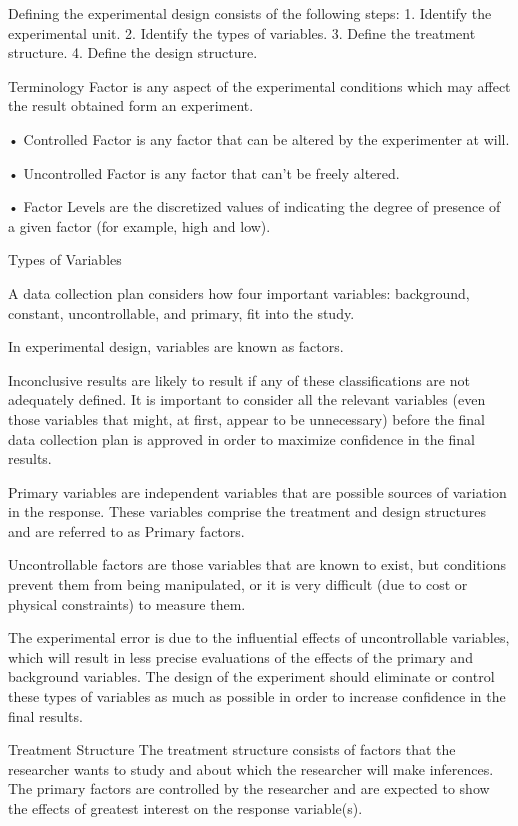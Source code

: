 Defining the experimental design consists of the following steps:
1. Identify the experimental unit.
2. Identify the types of variables.
3. Define the treatment structure.
4. Define the design structure.

Terminology
Factor is any aspect of the experimental conditions which may affect the result obtained form an experiment. 

•	Controlled Factor is any factor that can be altered by the experimenter at will.

•	Uncontrolled Factor is any factor that can’t be freely altered.

•	Factor Levels are the discretized values of indicating the degree of presence of a given factor (for example, high and low).


Types of Variables

A data collection plan considers how four important variables: background, constant, uncontrollable, and primary, fit into the study. 

In experimental design, variables are known as factors.

Inconclusive results are likely to result if any of these classifications are not adequately defined. It is important to consider all the relevant
variables (even those variables that might, at first, appear to be unnecessary) before the final data collection plan is approved in order to maximize confidence in the final results.

Primary variables are independent variables that are possible sources of variation in the response. These variables comprise the treatment and design structures and are referred to as Primary factors.

Uncontrollable factors are those variables that are known to exist, but
conditions prevent them from being manipulated, or it is very difficult (due to cost or physical constraints) to measure them.


The experimental error is due to the influential effects of uncontrollable variables, which will result in less precise evaluations of the effects of the primary and background variables. The design of the experiment should eliminate or control these types of variables as much as possible in order to increase confidence in the final results.


Treatment Structure
The treatment structure consists of factors that the researcher wants to study and about which the researcher will make inferences. The primary factors are controlled by the researcher and are expected to show the effects of greatest interest on the response variable(s). 

